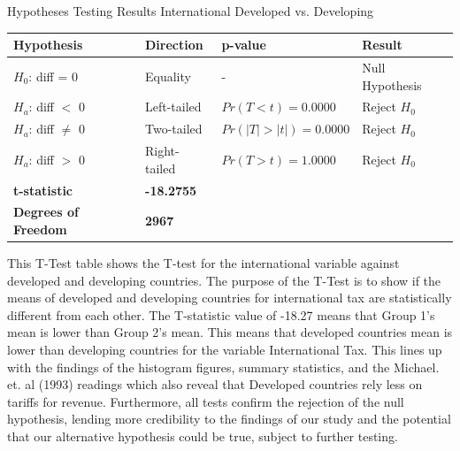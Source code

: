 \documentclass[12pt]{article}
\begin{document}
\centering
\caption{Hypotheses Testing Results International Developed vs. Developing}
\label{tab:hypothesis_test}
\renewcommand{\arraystretch}{1.2} %
\begin{tabular}{|l|l|l|l|}
\hline
\textbf{Hypothesis}          & \textbf{Direction} & \textbf{p-value}      & \textbf{Result}       \\ \hline
$H_0$: diff = 0              & Equality           & -                     & Null Hypothesis       \\ \hline
$H_a$: diff $<$ 0            & Left-tailed        & $Pr(T < t) = 0.0000$  & Reject $H_0$          \\ \hline
$H_a$: diff $\neq$ 0         & Two-tailed         & $Pr(|T| > |t|) = 0.0000$ & Reject $H_0$       \\ \hline
$H_a$: diff $>$ 0            & Right-tailed       & $Pr(T > t) = 1.0000$  & Reject $H_0$          \\ \hline
\textbf{t-statistic}         & \textbf{-18.2755}  &                       &                       \\ \hline
\textbf{Degrees of Freedom}  & \textbf{2967}      &                       &                       \\ \hline
\end{tabular}

\bigskip
\raggedright
This T-Test table shows the T-test for the international variable against developed and developing countries. The purpose of the T-Test is to show if the means of developed and developing countries for international tax are statistically different from each other. The T-statistic value of -18.27 means that Group 1's mean is lower than Group 2's mean. This means that developed countries mean is lower than developing countries for the variable International Tax. This lines up with the findings of the histogram figures, summary statistics, and the  Michael. et. al (1993) readings which also reveal that Developed countries rely less on tariffs for revenue. Furthermore, all tests confirm the rejection of the null hypothesis, lending more credibility to the findings of our study and the potential that our alternative hypothesis could be true, subject to further testing. 
\end{document}

